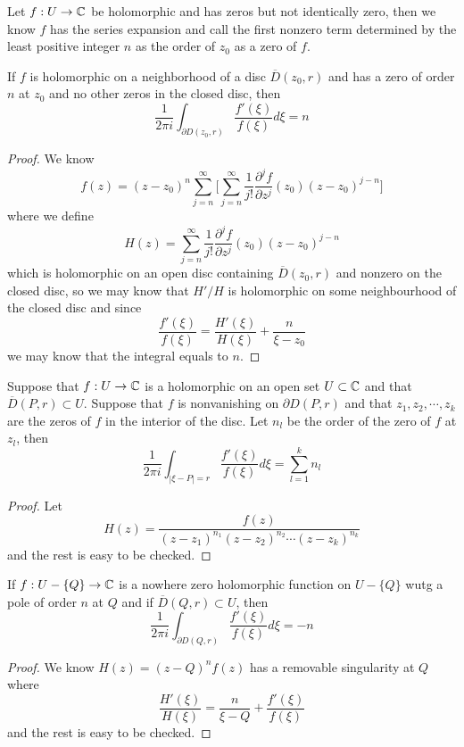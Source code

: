 \begin{definition}
    Let $f:U\to\mathbb{C}$ be holomorphic and has zeros but not identically zero, then we know $f$ has the series expansion and call the first nonzero term determined by the least positive integer $n$ as the order of $z_0$ as a zero of $f$.
\end{definition}

\begin{lemma}
    If $f$ is holomorphic on a neighborhood of a disc $\overline{D}(z_0,r)$ and has a zero of order $n$ at $z_0$ and no other zeros in the closed disc, then
    \[\dfrac{1}{2\pi i}\int_{\partial D(z_0,r)}\dfrac{f'(\xi)}{f(\xi)}d\xi = n\]
\end{lemma}
\begin{proof}
    We know
    \[f(z) = (z-z_0)^n\sum\limits_{j=n}^{\infty}\Big[\sum\limits_{j=n}^{\infty}\dfrac{1}{j!}\dfrac{\partial^j f}{\partial z^j}(z_0)(z-z_0)^{j-n}\Big]\]
    where we define 
    \[H(z) = \sum\limits_{j=n}^{\infty}\dfrac{1}{j!}\dfrac{\partial^j f}{\partial z^j}(z_0)(z-z_0)^{j-n}\]
    which is holomorphic on an open disc containing $\overline{D}(z_0,r)$ and nonzero on the closed disc, so we may know that $H'/H$ is holomorphic on some neighbourhood of the closed disc and since
    \[
    \dfrac{f'(\xi)}{f(\xi)} = \dfrac{H'(\xi)}{H(\xi)} + \dfrac{n}{\xi - z_0}
    \]
    we may know that the integral equals to $n$.
\end{proof}

\begin{proposition}
    Suppose that $f:U\to\mathbb{C}$ is a holomorphic on an open set $U\subset\mathbb{C}$ and that $\overline{D}(P,r)\subset U$. Suppose that $f$ is nonvanishing on $\partial D(P,r)$ and that $z_1,z_2,\cdots,z_k$ are the zeros of $f$ in the interior of the disc. Let $n_l$ be the order of the zero of $f$ at $z_l$, then
    \[\dfrac{1}{2\pi i}\int_{|\xi-P| = r}\dfrac{f'(\xi)}{f(\xi)}d\xi = \sum\limits_{l=1}^k n_l\]
\end{proposition}
\begin{proof}
    Let
    \[H(z) = \dfrac{f(z)}{(z-z_1)^{n_1}(z-z_2)^{n_2}\cdots(z-z_k)^{n_k}}\]
    and the rest is easy to be checked.
\end{proof}

\begin{lemma}
    If $f:U-\{Q\} \to \mathbb{C}$ is a nowhere zero holomorphic function on $U-\{Q\}$ wutg a pole of order $n$ at $Q$ and if $\overline{D}(Q,r)\subset U$, then
    \[\dfrac{1}{2\pi i}\int_{\partial D(Q,r)}\dfrac{f'(\xi)}{f(\xi)} d\xi = -n\]
\end{lemma}
\begin{proof}
    We know $H(z) = (z-Q)^nf(z)$ has a removable singularity at $Q$ where
    \[\dfrac{H'(\xi)}{H(\xi)} = \dfrac{n}{\xi-Q}+\dfrac{f'(\xi)}{f(\xi)}\]
    and the rest is easy to be checked.
\end{proof}

